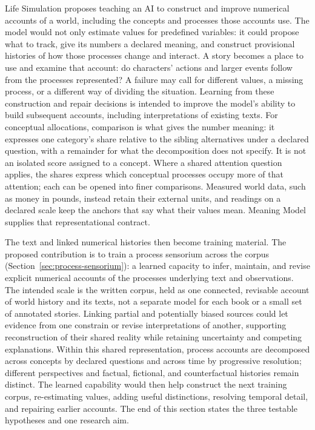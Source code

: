 \documentclass[10pt]{article}
\begin{document}
Life Simulation proposes teaching an AI to construct and improve numerical
accounts of a world, including the concepts and processes those accounts use.
The model would not only estimate values for predefined variables: it could
propose what to track, give its numbers a declared meaning, and construct
provisional histories of how those processes change and interact. A story
becomes a place to use and examine that account: do characters' actions and
larger events follow from the processes represented? A failure may call for
different values, a missing process, or a different way of dividing the
situation. Learning from these construction and repair decisions is intended
to improve the model's ability to build subsequent accounts, including
interpretations of existing texts. For conceptual
allocations, comparison is what gives the number
meaning: it expresses one category's share relative to the sibling alternatives
under a declared question, with a remainder for what the decomposition does
not specify. It is not an isolated score assigned to a concept. Where a shared
attention question applies, the shares express which conceptual processes
occupy more of that attention; each can be opened into finer comparisons.
Measured world data, such as money in pounds, instead retain their external
units, and readings on a declared scale keep the anchors that say what their
values mean. Meaning Model supplies that representational contract.

The text and linked numerical histories then become training material.
The proposed contribution is to train a process sensorium across the corpus
(Section~\ref{sec:process-sensorium}): a learned capacity to infer, maintain,
and revise explicit numerical accounts of the processes underlying text and
observations. The intended scale is the written corpus, held as one connected,
revisable account of world history and its texts, not a separate model for each
book or a small set of annotated stories. Linking partial and
potentially biased sources could let evidence from one constrain or revise
interpretations of another, supporting reconstruction of their shared reality
while retaining uncertainty and competing explanations. Within this shared
representation, process accounts are decomposed across concepts by declared
questions and across time by progressive resolution; different perspectives and
factual, fictional, and counterfactual histories remain distinct. The learned capability would then help construct the next
training corpus, re-estimating values, adding useful distinctions, resolving
temporal detail, and repairing earlier accounts. The end of this section
states the three testable hypotheses and one research aim.
\end{document}
